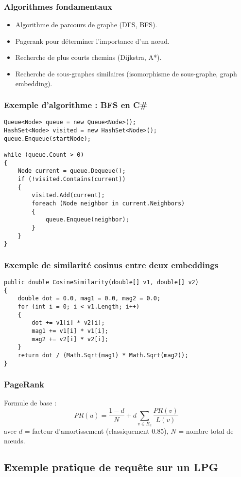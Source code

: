 \documentclass{beamer}
\begin{document}
\begin{frame}
  \frametitle{Algorithmes fondamentaux}
  \begin{itemize}
    \item Algorithme de parcours de graphe (DFS, BFS).
    \item Pagerank pour déterminer l’importance d’un nœud.
    \item Recherche de plus courts chemins (Dijkstra, A*).
    \item Recherche de sous-graphes similaires (isomorphisme de sous-graphe, graph embedding).
  \end{itemize}
\end{frame}

\begin{frame}[fragile]
  \frametitle{Exemple d’algorithme : BFS en C\#}
\begin{lstlisting}
Queue<Node> queue = new Queue<Node>();
HashSet<Node> visited = new HashSet<Node>();
queue.Enqueue(startNode);

while (queue.Count > 0)
{
    Node current = queue.Dequeue();
    if (!visited.Contains(current))
    {
        visited.Add(current);
        foreach (Node neighbor in current.Neighbors)
        {
            queue.Enqueue(neighbor);
        }
    }
}
\end{lstlisting}
\end{frame}

\begin{frame}[fragile]
  \frametitle{Exemple de similarité cosinus entre deux embeddings}
\begin{lstlisting}
public double CosineSimilarity(double[] v1, double[] v2)
{
    double dot = 0.0, mag1 = 0.0, mag2 = 0.0;
    for (int i = 0; i < v1.Length; i++)
    {
        dot += v1[i] * v2[i];
        mag1 += v1[i] * v1[i];
        mag2 += v2[i] * v2[i];
    }
    return dot / (Math.Sqrt(mag1) * Math.Sqrt(mag2));
}
\end{lstlisting}
\end{frame}

\begin{frame}
  \frametitle{PageRank}
  Formule de base :
  \[
  PR(u) = \frac{1-d}{N} + d \sum_{v \in B_u} \frac{PR(v)}{L(v)}
  \]
  avec \( d \) = facteur d’amortissement (classiquement 0.85), \( N \) = nombre total de nœuds.
\end{frame}

\subsection{Exemple pratique de requête sur un LPG}
\end{document}
